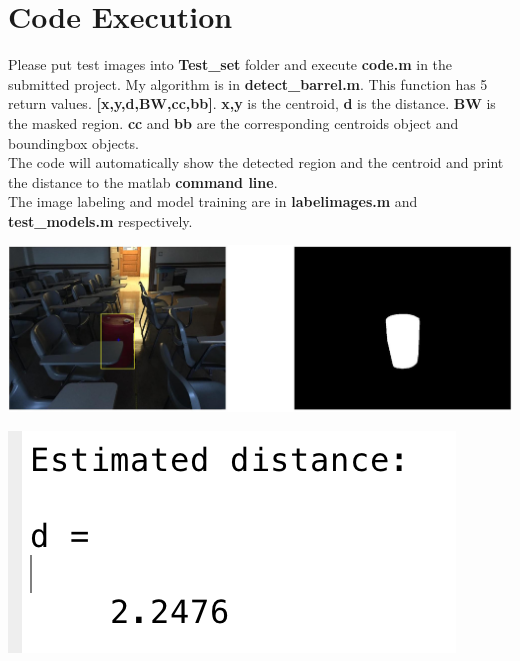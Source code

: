 \documentclass[english]{article}
\begin{document}
\section {Code Execution}
Please put test images into \textbf{Test\_set} folder and execute \textbf{code.m} in the submitted project. My algorithm is in \textbf{detect\_barrel.m}. This function has 5 return values.  \textbf{[x,y,d,BW,cc,bb]}. \textbf{x,y} is the centroid, \textbf{d} is the distance. \textbf{BW} is the masked region. \textbf{cc} and \textbf{bb} are the corresponding centroids object and boundingbox objects.  \\
The code will automatically show the detected region and the centroid and print the distance to the matlab \textbf{command line}.\\
The image labeling and model training are in \textbf{labelimages.m} and \textbf{test\_models.m} respectively.
\begin{center}
\includegraphics[scale=0.2]{detection_ex1}
\end{center}
\begin{center}
\includegraphics[scale=1]{distance_display}
\end{center}
\end{document}
